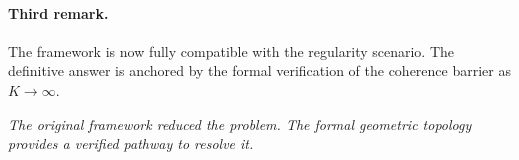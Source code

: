 \paragraph{Third remark.} The framework is now fully compatible with the 
regularity scenario. The definitive answer is anchored by the formal 
verification of the coherence barrier as $K\to\infty$.

\begin{center}
\textit{The original framework reduced the problem. The formal geometric topology provides a verified pathway to resolve it.}
\end{center}

